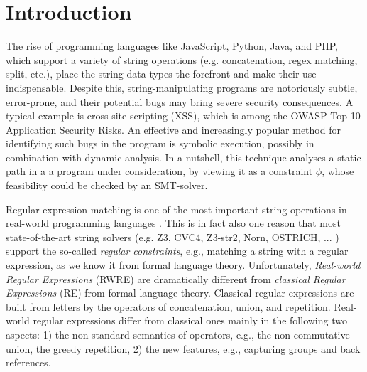 
\section{Introduction}



%
The rise of programming 
languages like JavaScript, Python, Java, and PHP, which support a variety of
string operations (e.g. concatenation, regex matching, split, etc.), place
the string data types the forefront and make their use indispensable.
Despite this,
string-manipulating programs are notoriously subtle, error-prone, and their 
potential bugs
may bring severe security consequences. A typical example is cross-site
scripting (XSS), which is among the OWASP Top 10 Application Security Risks.
An effective and increasingly popular method for identifying such bugs
in the program is symbolic execution, possibly in combination with dynamic
analysis. In a nutshell, this technique analyses a static path in a
a program under consideration, by viewing it as a constraint $\phi$, whose 
feasibility could be checked by an SMT-solver.

Regular expression matching is one of the most important string operations
in real-world programming languages \cite{Berkeley-JavaScript,BM17,LMK19,HAMPI}.
This is in fact also one reason that most state-of-the-art string solvers (e.g.
Z3, CVC4, Z3-str2, Norn, OSTRICH, ... ) support
the so-called \emph{regular constraints}, e.g., matching a string with a 
regular expression, as we know it from formal language theory. Unfortunately, 
\emph{Real-world Regular Expressions} (RWRE) are dramatically different from 
\emph{classical Regular Expressions} (RE) from formal language theory. 
Classical regular expressions are built from letters by the operators of concatenation, union, and repetition. Real-world regular expressions differ from classical ones mainly in the following two aspects: 1) the non-standard semantics of 
operators, e.g., the non-commutative union, the greedy repetition, 2) the new 
features, e.g., capturing groups and back references.


